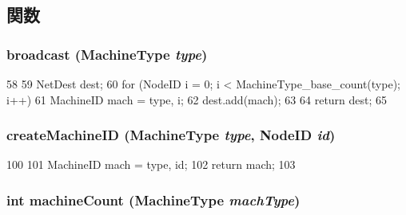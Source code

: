 \subsection{関数}
\hypertarget{RubySlicc__ComponentMapping_8hh_a366bb42c15ca556679ac10b479bc4d8d}{
\subsubsection[{broadcast}]{ broadcast (MachineType {\em type})}}
\label{RubySlicc__ComponentMapping_8hh_a366bb42c15ca556679ac10b479bc4d8d}



\begin{DoxyCode}
58 {
59     NetDest dest;
60     for (NodeID i = 0; i < MachineType_base_count(type); i++) {
61         MachineID mach = {type, i};
62         dest.add(mach);
63     }
64     return dest;
65 }
\end{DoxyCode}
\hypertarget{RubySlicc__ComponentMapping_8hh_abf6136c785cbdaa0fc2ff047af75152b}{
\subsubsection[{createMachineID}]{ createMachineID (MachineType {\em type}, \/  {\bf NodeID} {\em id})}}
\label{RubySlicc__ComponentMapping_8hh_abf6136c785cbdaa0fc2ff047af75152b}



\begin{DoxyCode}
100 {
101     MachineID mach = {type, id};
102     return mach;
103 }
\end{DoxyCode}
\hypertarget{RubySlicc__ComponentMapping_8hh_a1250f76522e6deb7118fe2c84d16ed84}{
\subsubsection[{machineCount}]{\setlength{\rightskip}{0pt plus 5cm}int machineCount (MachineType {\em machType})}}
\label{RubySlicc__ComponentMapping_8hh_a1250f76522e6deb7118fe2c84d16ed84}



